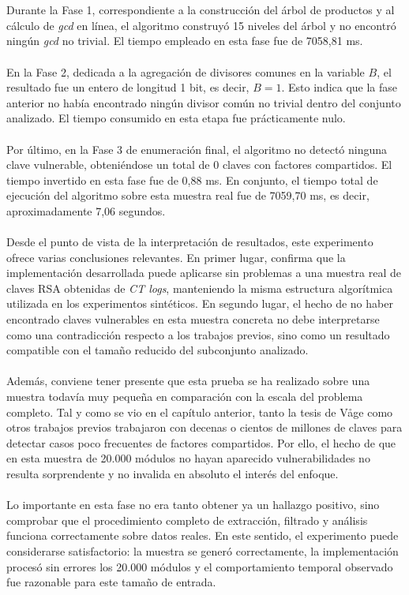 \\
\\
Durante la Fase 1, correspondiente a la construcción del árbol de productos y al cálculo de \textit{gcd} en línea, el algoritmo construyó 15 niveles del árbol y no encontró ningún \textit{gcd} no trivial. El tiempo empleado en esta fase fue de 7058,81 ms.
\\
\\
En la Fase 2, dedicada a la agregación de divisores comunes en la variable \(B\), el resultado fue un entero de longitud 1 bit, es decir, \(B = 1\). Esto indica que la fase anterior no había encontrado ningún divisor común no trivial dentro del conjunto analizado. El tiempo consumido en esta etapa fue prácticamente nulo.
\\
\\
Por último, en la Fase 3 de enumeración final, el algoritmo no detectó ninguna clave vulnerable, obteniéndose un total de 0 claves con factores compartidos. El tiempo invertido en esta fase fue de 0,88 ms. En conjunto, el tiempo total de ejecución del algoritmo sobre esta muestra real fue de 7059,70 ms, es decir, aproximadamente 7,06 segundos.
\\
\\
Desde el punto de vista de la interpretación de resultados, este experimento ofrece varias conclusiones relevantes. En primer lugar, confirma que la implementación desarrollada puede aplicarse sin problemas a una muestra real de claves RSA obtenidas de \textit{CT logs}, manteniendo la misma estructura algorítmica utilizada en los experimentos sintéticos. En segundo lugar, el hecho de no haber encontrado claves vulnerables en esta muestra concreta no debe interpretarse como una contradicción respecto a los trabajos previos, sino como un resultado compatible con el tamaño reducido del subconjunto analizado.
\\
\\
Además, conviene tener presente que esta prueba se ha realizado sobre una muestra todavía muy pequeña en comparación con la escala del problema completo. Tal y como se vio en el capítulo anterior, tanto la tesis de Våge como otros trabajos previos trabajaron con decenas o cientos de millones de claves para detectar casos poco frecuentes de factores compartidos. Por ello, el hecho de que en esta muestra de 20.000 módulos no hayan aparecido vulnerabilidades no resulta sorprendente y no invalida en absoluto el interés del enfoque.
\\
\\
Lo importante en esta fase no era tanto obtener ya un hallazgo positivo, sino comprobar que el procedimiento completo de extracción, filtrado y análisis funciona correctamente sobre datos reales. En este sentido, el experimento puede considerarse satisfactorio: la muestra se generó correctamente, la implementación procesó sin errores los 20.000 módulos y el comportamiento temporal observado fue razonable para este tamaño de entrada.
